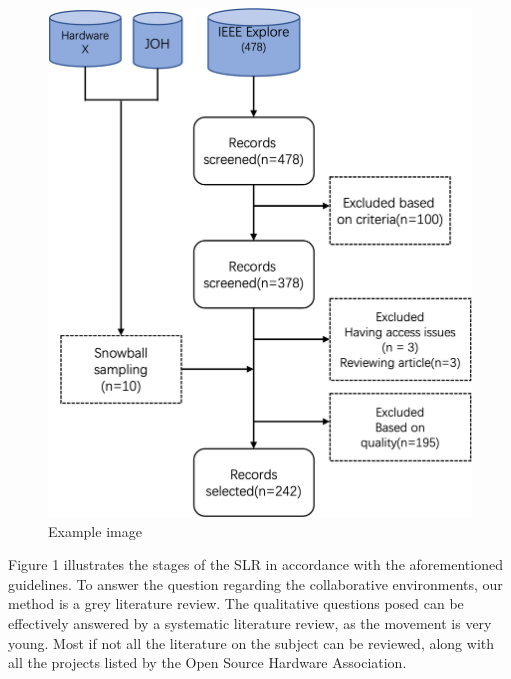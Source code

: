 \documentclass[final-report.tex]{subfiles}
\begin{document}
\begin{figure}[!h]
    \begin{minipage}{0.4\textwidth}
        \centering
        \includegraphics[width=\textwidth]{Images/SLR.png}
        \caption{Example image}
        \label{fig:1}
    \end{minipage}
\end{figure}
Figure 1 
illustrates the stages of the SLR in accordance with the aforementioned guidelines.
To answer the question regarding the collaborative environments, our method is a grey literature review. 
The qualitative questions posed can be effectively answered by a systematic literature review, as the movement is very young. 
Most if not all the literature on the subject can be reviewed, along with all the projects listed by the Open Source Hardware Association.


\end{document}
